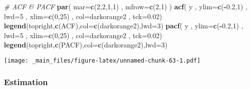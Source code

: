 \documentclass[
]{book}
\newenvironment{Shaded}{\begin{snugshade}}{\end{snugshade}}
\newcommand{\AttributeTok}[1]{\textcolor[rgb]{0.13,0.29,0.53}{#1}}
\newcommand{\CommentTok}[1]{\textcolor[rgb]{0.56,0.35,0.01}{\textit{#1}}}
\newcommand{\DecValTok}[1]{\textcolor[rgb]{0.00,0.00,0.81}{#1}}
\newcommand{\FloatTok}[1]{\textcolor[rgb]{0.00,0.00,0.81}{#1}}
\newcommand{\FunctionTok}[1]{\textcolor[rgb]{0.13,0.29,0.53}{\textbf{#1}}}
\newcommand{\NormalTok}[1]{#1}
\newcommand{\SpecialCharTok}[1]{\textcolor[rgb]{0.81,0.36,0.00}{\textbf{#1}}}
\newcommand{\StringTok}[1]{\textcolor[rgb]{0.31,0.60,0.02}{#1}}
\begin{document}
\begin{Shaded}
\begin{Highlighting}[]
\CommentTok{\# ACF \& PACF}
\FunctionTok{par}\NormalTok{( }\AttributeTok{mar=}\FunctionTok{c}\NormalTok{(}\DecValTok{2}\NormalTok{,}\DecValTok{2}\NormalTok{,}\DecValTok{1}\NormalTok{,}\DecValTok{1}\NormalTok{) , }\AttributeTok{mfrow=}\FunctionTok{c}\NormalTok{(}\DecValTok{2}\NormalTok{,}\DecValTok{1}\NormalTok{) )}
\FunctionTok{acf}\NormalTok{( y , }\AttributeTok{ylim=}\FunctionTok{c}\NormalTok{(}\SpecialCharTok{{-}}\FloatTok{0.2}\NormalTok{,}\DecValTok{1}\NormalTok{) , }\AttributeTok{lwd=}\DecValTok{5}\NormalTok{ , }\AttributeTok{xlim=}\FunctionTok{c}\NormalTok{(}\DecValTok{0}\NormalTok{,}\DecValTok{25}\NormalTok{) , }\AttributeTok{col=}\StringTok{\textquotesingle{}darkorange2\textquotesingle{}}\NormalTok{ , }\AttributeTok{tck=}\FloatTok{0.02}\NormalTok{)}
\FunctionTok{legend}\NormalTok{(}\StringTok{\textquotesingle{}topright\textquotesingle{}}\NormalTok{,}\FunctionTok{c}\NormalTok{(}\StringTok{\textquotesingle{}ACF\textquotesingle{}}\NormalTok{),}\AttributeTok{col=}\FunctionTok{c}\NormalTok{(}\StringTok{\textquotesingle{}darkorange2\textquotesingle{}}\NormalTok{),}\AttributeTok{lwd=}\DecValTok{3}\NormalTok{)}
\FunctionTok{pacf}\NormalTok{( y , }\AttributeTok{ylim=}\FunctionTok{c}\NormalTok{(}\SpecialCharTok{{-}}\FloatTok{0.2}\NormalTok{,}\DecValTok{1}\NormalTok{) , }\AttributeTok{lwd=}\DecValTok{5}\NormalTok{ , }\AttributeTok{xlim=}\FunctionTok{c}\NormalTok{(}\DecValTok{0}\NormalTok{,}\DecValTok{25}\NormalTok{) , }\AttributeTok{col=}\StringTok{\textquotesingle{}darkorange2\textquotesingle{}}\NormalTok{ , }\AttributeTok{tck=}\FloatTok{0.02}\NormalTok{)}
\FunctionTok{legend}\NormalTok{(}\StringTok{\textquotesingle{}topright\textquotesingle{}}\NormalTok{,}\FunctionTok{c}\NormalTok{(}\StringTok{\textquotesingle{}PACF\textquotesingle{}}\NormalTok{),}\AttributeTok{col=}\FunctionTok{c}\NormalTok{(}\StringTok{\textquotesingle{}darkorange2\textquotesingle{}}\NormalTok{),}\AttributeTok{lwd=}\DecValTok{3}\NormalTok{)}
\end{Highlighting}
\end{Shaded}

\texttt{[image: \_main\_files/figure-latex/unnamed-chunk-63-1.pdf]}

\hypertarget{estimation}{%
\subsubsection*{Estimation}\label{estimation}}
\end{document}
